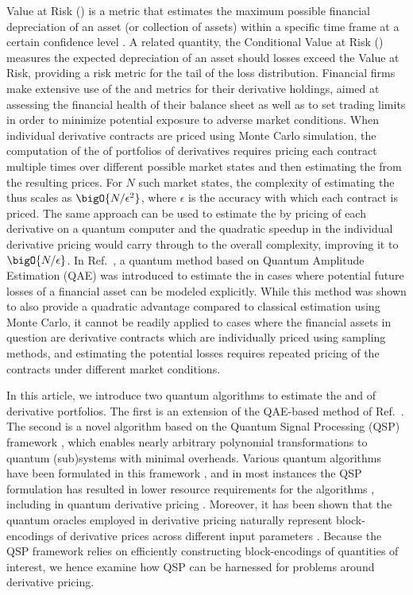 Value at Risk (\var{}) is a metric that estimates the maximum possible financial depreciation of an asset (or collection of assets) within a specific time frame at a certain confidence level \cite{Markowitz1952, Roy1952}.
A related quantity, the Conditional Value at Risk (\cvar{}) measures the expected depreciation of an asset should losses exceed the Value at Risk, providing a risk metric for the tail of the loss distribution.
Financial firms make extensive use of the \var{} and \cvar{} metrics for their derivative holdings, aimed at assessing the financial health of their balance sheet as well as to set trading limits in order to minimize potential exposure to adverse market conditions.
When individual derivative contracts are priced using Monte Carlo simulation, the computation of the \var{} of portfolios of derivatives requires pricing each contract multiple times over different possible market states and then estimating the \var{} from the resulting prices.
For $N$ such market states, the complexity of estimating the \var{} thus scales as $\bigO{N/\epsilon^2}$, where $\epsilon$ is the accuracy with which each contract is priced.
The same approach can be used to estimate the \var{} by pricing of each derivative on a quantum computer and the quadratic speedup in the individual derivative pricing would carry through to the overall complexity, improving it to $\bigO{N/\epsilon}$.
In Ref.~\cite{Woerner_2019, egger2019credit}, a quantum method based on Quantum Amplitude Estimation (QAE) was introduced to estimate the \var{} in cases where potential future losses of a financial asset can be modeled explicitly.
While this method was shown to also provide a quadratic advantage compared to classical \var{} estimation using Monte Carlo, it cannot be readily applied to cases where the financial assets in question are derivative contracts which are individually priced using sampling methods, and estimating the potential losses requires repeated pricing of the contracts under different market conditions.

In this article, we introduce two quantum algorithms to estimate the \var{} and \cvar{} of derivative portfolios.
The first is an extension of the QAE-based method of Ref.~\cite{Woerner_2019, egger2019credit}.
The second is a novel algorithm based on the Quantum Signal Processing (QSP) framework \cite{Low2017optimal, gilyen2019quantum, low2019hamiltonian, Kikuchi_2023}, which enables nearly arbitrary polynomial transformations to quantum (sub)systems with minimal overheads.
Various quantum algorithms have been formulated in this framework \cite{martyn2021grand}, and in most instances the QSP formulation has resulted in lower resource requirements for the algorithms \cite{martyn2021efficient, Lin_2020, Rall_2023}, including in quantum derivative pricing \cite{stamatopoulos2023derivative}.
Moreover, it has been shown that the quantum oracles employed in derivative pricing naturally represent block-encodings of derivative prices across different input parameters \cite{gilyen2019optimizing, Stamatopoulos_2022}.
Because the QSP framework relies on efficiently constructing block-encodings of quantities of interest, we hence examine how QSP can be harnessed for problems around derivative pricing.

